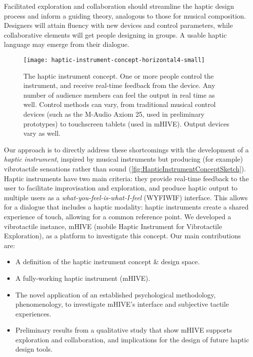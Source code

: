 Facilitated exploration and collaboration %
should streamline the haptic design process and inform a guiding 
theory, analogous to those for musical composition. %
Designers will attain fluency with new devices and control parameters,
while collaborative elements %
will get people designing in groups.  A usable haptic language may emerge  from their dialogue.




\begin{figure*}[Htb]
   \centering
   \texttt{[image: haptic-instrument-concept-horizontal4-small]} 
   \caption{The haptic instrument concept. One or more people control the instrument, and receive real-time feedback from the device. Any number of audience members can feel the output in real time as well. Control methods can vary, from traditional musical control devices (such as the M-Audio Axiom 25, used in preliminary prototypes) to touchscreen tablets (used in mHIVE). Output devices vary as well.}
   \label{fig:HapticInstrumentConcept}
\end{figure*}





Our approach is to directly address these shortcomings with the development of a \emph{haptic instrument}, inspired by musical instruments but producing (for example) vibrotactile sensations rather than sound (\autoref{fig:HapticInstrumentConceptSketch}).
Haptic instruments have two main criteria: they provide real-time feedback to the user to facilitate improvisation and exploration, and produce haptic output to multiple users as a \emph{what-you-feel-is-what-I-feel} (WYFIWIF) interface.
This allows for a dialogue that includes a haptic modality: haptic instruments create a shared experience of touch, allowing for a common reference point.
We developed a vibrotactile instance, mHIVE (mobile Haptic Instrument for Vibrotactile Exploration), as a platform to investigate this concept.
Our main contributions are:
\begin {itemize}
	\item A definition of the haptic instrument concept \& design space.
	\item A fully-working haptic instrument (mHIVE).
	\item The novel application of an established psychological methodology, phenomenology, to investigate mHIVE's interface and subjective tactile experiences.
	\item Preliminary results from a qualitative study that show mHIVE supports exploration and collaboration, and implications for the design of future haptic design tools.
\end{itemize}

